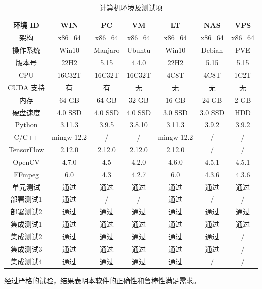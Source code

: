 \begin{table}[h!]
\centering
\begin{tabular}{|c|cccccc|} 
    \hline
    环境 ID &
    WIN & PC & VM &
    LT & NAS & VPS \\ 
    \hline
    架构 &
    x86\_64 & x86\_64 & x86\_64 &
    x86\_64 & x86\_64 & x86\_64 \\
    \hline
    操作系统 &
    Win10 & Manjaro & Ubuntu &
    Win10 & Debian & PVE \\
    \hline
    版本号 &
    22H2 & 5.15 & 4.4.0 &
    22H2 & 5.15 & 5.15 \\
    \hline
    CPU &
    16C32T & 16C32T & 16C32T &
    4C8T & 4C8T & 1C2T  \\
    \hline
    CUDA 支持 &
    有 & 有 & 无 &
    无 & 无 & 无 \\
    \hline
    内存 &
    64 GB & 64 GB & 32 GB &
    16 GB & 24 GB & 2 GB \\
    \hline
    硬盘速度 &
    4.0 SSD & 4.0 SSD & 4.0 SSD &
    3.0 SSD & 3.0 SSD & HDD \\
    \hline
    Python &
    3.11.3 & 3.9.5 & 3.8.10 &
    3.11.3 & 3.9.2 & 3.9.2 \\
    \hline
    C/C++ &
    mingw 12.2 & / & / &
    mingw 12.2 & / & / \\
    \hline
    TensorFlow &
    2.12.0 & 2.12.0 & 2.12.0 &
    2.12.0 & / & / \\
    \hline
    OpenCV &
    4.7.0 & 4.5 & 4.2.0 &
    4.6.0 & 4.5.1 & 4.5.1 \\
    \hline
    FFmpeg &
    6.0 & 4.3 & 4.2.7 &
    6.0 & 4.3.6 & 4.3.6 \\
    \hline
    单元测试 &
    通过 & 通过 & 通过 &
    通过 & 通过 & 通过 \\
    \hline
    部署测试1 &
    通过 & / & / &
    通过 & / & / \\
    \hline
    部署测试2 &
    通过 & 通过 & 通过 &
    通过 & 通过 & 通过 \\
    \hline
    集成测试1 &
    通过 & 通过 & 通过 &
    通过 & 通过 & 通过 \\
    \hline
    集成测试2 &
    通过 & 通过 & 通过 &
    通过 & 通过 & / \\
    \hline
    集成测试3 &
    通过 & 通过 & 通过 &
    通过 & 通过 & / \\
    \hline
    集成测试4 &
    通过 & 通过 & 通过 &
    通过 & / & / \\
    \hline
\end{tabular}
\caption{计算机环境及测试项}
\label{table:test}
\end{table}

经过严格的试验，结果表明本软件的正确性和鲁棒性满足需求。
